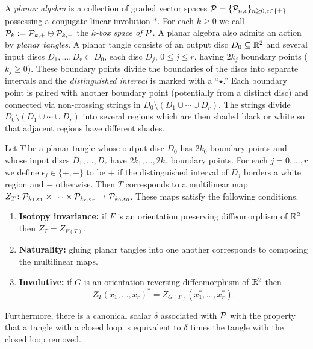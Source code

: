 \begin{defi}
A \emph{planar algebra} is a collection of graded vector spaces $\mathcal{P}=\{\mathcal{P}_{n,\epsilon}\}_{n\geq 0,\epsilon\in\{\pm\}}$ possessing a conjugate linear involution $*$. For each $k\geq 0$ we call $\mathcal{P}_k:=\mathcal{P}_{k,+}\oplus \mathcal{P}_{k,-}$ the \emph{$k$-box space of $\mathcal{P}$}. A planar algebra also admits an action by \emph{planar tangles}. A planar tangle consists of an output disc $D_0\subseteq \mathbb{R}^2$ and several input discs $D_1,\ldots, D_r\subset D_0$, each disc $D_j$, $0\leq j\leq r$, having $2k_j$ boundary points ($k_j\geq 0$). These boundary points divide the boundaries of the discs into separate intervals and the \emph{distinguished interval} is marked with a ``$\star$.'' Each boundary point is paired with another boundary point (potentially from a distinct disc) and connected via non-crossing strings in $D_0\setminus (D_1\cup\cdots\cup D_r)$. The strings divide $D_0\setminus (D_1\cup\cdots\cup D_r)$ into several regions which are then shaded black or white so that adjacent regions have different shades.

Let $T$ be a planar tangle whose output disc $D_0$ has $2k_0$ boundary points and whose input discs $D_1,\ldots, D_r$ have $2k_1,\ldots, 2k_r$ boundary points. For each $j=0,\ldots, r$ we define $\epsilon_j\in\{+,-\}$ to be $+$ if the distinguished interval of $D_j$ borders a white region and $-$ otherwise. Then $T$ corresponds to a multilinear map $Z_T\colon \mathcal{P}_{k_1,\epsilon_1}\times\cdots\times \mathcal{P}_{k_r,\epsilon_r}\to \mathcal{P}_{k_0,\epsilon_0}$. These maps satisfy the following conditions.
\begin{enumerate}
\item \textbf{Isotopy invariance:} if $F$ is an orientation preserving diffeomorphism of $\mathbb{R}^2$ then $Z_{T}=Z_{F(T)}$.
\item \textbf{Naturality:} gluing planar tangles into one another corresponds to composing the multilinear maps.
\item \textbf{Involutive:} if $G$ is an orientation reversing diffeomorphism of $\mathbb{R}^2$ then
\[
Z_T(x_1,\ldots, x_r)^*=Z_{G(T)}(x_1^*,\ldots, x_r^*).
\]
\end{enumerate}
Furthermore, there is a canonical scalar $\delta$ associated with $\mathcal{P}$ with the property that a tangle with a closed loop is equivalent to $\delta$ times the tangle with the closed loop removed.
.
\end{defi}


